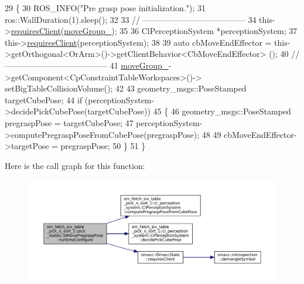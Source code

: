 \begin{DoxyCode}
29             \{
30                 ROS\_INFO(\textcolor{stringliteral}{"Pre grasp pose initialization."});
31                 ros::WallDuration(1).sleep();
32 
33                 \textcolor{comment}{// --------------------------------------}
34                 this->\hyperlink{classsmacc_1_1ISmaccState_a7f95c9f0a6ea2d6f18d1aec0519de4ac}{requiresClient}(\hyperlink{structsm__fetch__six__table__pick__n__sort__1_1_1pick__states_1_1StMovePregraspPose_a363fe840010e6177725d10f40bb47e95}{moveGroup\_});
35                 
36                 ClPerceptionSystem *perceptionSystem;
37                 this->\hyperlink{classsmacc_1_1ISmaccState_a7f95c9f0a6ea2d6f18d1aec0519de4ac}{requiresClient}(perceptionSystem);
38 
39                 \textcolor{keyword}{auto} cbMoveEndEffector = this->getOrthogonal<OrArm>()->getClientBehavior<CbMoveEndEffector>
      ();
40                 \textcolor{comment}{// --------------------------------------}
41                 \hyperlink{structsm__fetch__six__table__pick__n__sort__1_1_1pick__states_1_1StMovePregraspPose_a363fe840010e6177725d10f40bb47e95}{moveGroup\_}->getComponent<CpConstraintTableWorkspaces>()->
      setBigTableCollisionVolume();
42 
43                 geometry\_msgs::PoseStamped targetCubePose;
44                 \textcolor{keywordflow}{if} (perceptionSystem->decidePickCubePose(targetCubePose))
45                 \{
46                     geometry\_msgs::PoseStamped pregraspPose = targetCubePose;
47                     perceptionSystem->computePregraspPoseFromCubePose(pregraspPose);
48 
49                     cbMoveEndEffector->targetPose = pregraspPose;
50                 \}
51             \}
\end{DoxyCode}
Here is the call graph for this function\+:
\nopagebreak
\begin{figure}[H]
\begin{center}
\leavevmode
\includegraphics[width=350pt]{structsm__fetch__six__table__pick__n__sort__1_1_1pick__states_1_1StMovePregraspPose_adfb7cd71656d92dbd174f781b03beaea_cgraph}
\end{center}
\end{figure}
